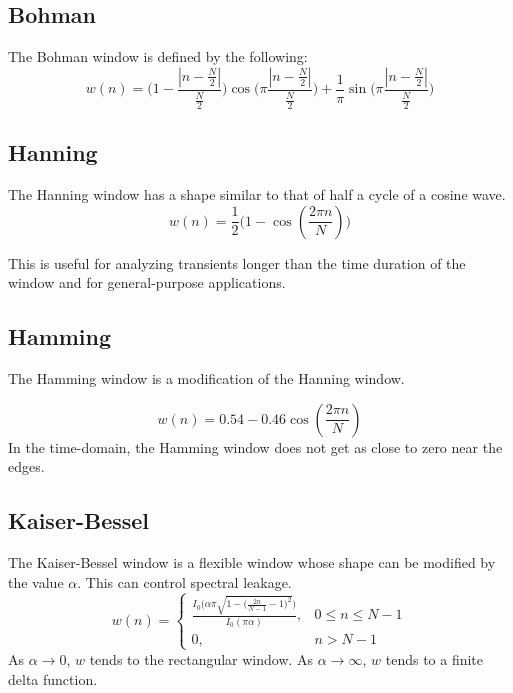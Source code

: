 \documentclass[oneside]{book}
\theoremstyle{mystyle}
\begin{document}
\subsection{Bohman}
\noindent The Bohman window is defined by the following:
\begin{equation}
w(n) = \bigg(1-\frac{|n-\frac{N}{2}|}{\frac{N}{2}}\bigg)\cos\bigg(\pi\frac{|n-\frac{N}{2}|}{\frac{N}{2}}\bigg)+\frac{1}{\pi}\sin\bigg(\pi\frac{|n-\frac{N}{2}|}{\frac{N}{2}}\bigg)
\end{equation}

\subsection{Hanning}
\noindent The Hanning window has a shape similar to that of half a cycle of a cosine wave.
\begin{equation}
w(n) = \frac{1}{2}\bigg(1-\cos(\frac{2\pi n}{N})\bigg)
\end{equation}

\noindent This is useful for analyzing transients longer than the time duration of the window and for general-purpose applications.

\subsection{Hamming}
The Hamming window is a modification of the Hanning window.

\begin{equation}
w(n) = 0.54 - 0.46\cos(\frac{2\pi n}{N})
\end{equation}
\noindent In the time-domain, the Hamming window does not get as close to zero near the edges.
\subsection{Kaiser-Bessel}
The Kaiser-Bessel window is a flexible window whose shape can be modified by the value $\alpha$. This can control spectral leakage.
\begin{equation}
w(n) = \begin{cases} \frac{I_{0}\bigg(\alpha \pi \sqrt{1-\big(\frac{2n}{N-1}-1\big)^2}\bigg)}{I_{0}(\pi\alpha)}, & 0 \leq n \leq N-1\\ 0, & n>N-1\end{cases}
\end{equation}
\noindent As $\alpha \rightarrow 0$, $w$ tends to the rectangular window. As $\alpha \rightarrow \infty$, $w$ tends to a finite delta function. 
\end{document}
